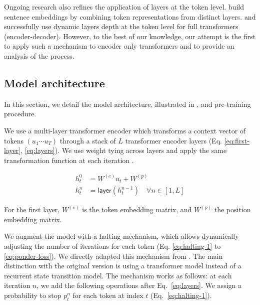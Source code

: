 Ongoing research also refines the application of layers at the token level. \textcite{wang_20} build sentence embeddings by combining token representations from distinct layers. \textcite{elbayad_20} and \textcite{dehghani_19} successfully use dynamic layers depth at the token level for full transformers (encoder-decoder). However, to the best of our knowledge, our attempt is the first to apply such a mechanism to encoder only transformers and to provide an analysis of the process. 


\subsection{Model architecture}

In this section, we detail the model architecture, illustrated in , and pre-training procedure.

We use a multi-layer transformer encoder \parencite{devlin_19} which transforms a context vector of tokens $(u_1 \cdots u_{T})$ through a stack of $L$ transformer encoder layers (Eq. \ref{eq:first-layer}, \ref{eq:layers}). 
We use weight tying across layers and apply the same transformation function at each iteration \parencite{lan_20}.

\begin{align}
    h^0_t &= W^{(e)}u_t + W^{(p)} \label{eq:first-layer}\\
    h^n_t &= \mathsf{layer}(h^{n-1}_t) \quad \forall n \in [1, L] \label{eq:layers}
\end{align}

For the first layer, $W^{(e)}$ is the token embedding matrix, and $W^{(p)}$ the position embedding matrix.

We augment the model with a halting mechanism, which allows dynamically adjusting the number of iterations for each token (Eq. \ref{eq:halting-1} to \ref{eq:ponder-loss}). We directly adapted this mechanism from \textcite{graves_16}. The main distinction with the original version is using a transformer model instead of a recurrent state transition model. The mechanism works as follows: at each iteration $n$, we add the following operations after Eq.~\ref{eq:layers}. We assign a probability to stop $p^n_t$ for each token at index $t$ (Eq.~\ref{eq:halting-1}). 

